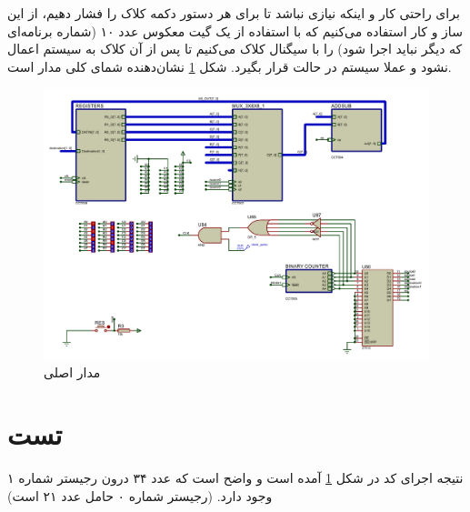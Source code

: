 \documentclass{article}
\begin{document}
برای راحتی کار و اینکه نیازی نباشد تا برای هر دستور دکمه کلاک را فشار دهیم، از این ساز و کار استفاده می‌کنیم که با استفاده از یک گیت  معکوس عدد ۱۰ (شماره برنامه‌ای که دیگر نباید اجرا شود) را با سیگنال کلاک  می‌کنیم تا پس از آن کلاک به سیستم اعمال نشود و عملا سیستم در حالت  قرار بگیرد. شکل \ref{main} نشان‌دهنده شمای کلی مدار است.

\begin{figure}[H]
	\centering
	\includegraphics[scale=0.5]{./graphics/main}
	\caption{مدار اصلی}
	\label{main}
\end{figure}

\section{تست}
نتیجه اجرای کد در شکل \ref{main} آمده است و واضح است که عدد ۳۴ درون رجیستر شماره ۱ وجود دارد. (رجیستر شماره ۰ حامل عدد ۲۱ است)
\end{document}
